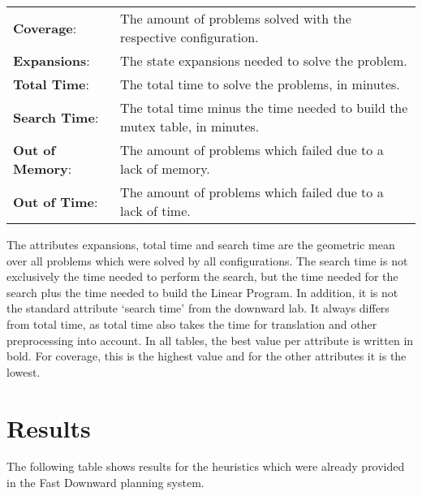 \begin{center}
    \begin{tabularx}{\textwidth}{@{}lX@{}}
        \textbf{Coverage}: & The amount of problems solved with the respective configuration. \\
        \textbf{Expansions}: & The state expansions needed to solve the problem. \\
        \textbf{Total Time}: & The total time to solve the problems, in minutes. \\
        \textbf{Search Time}: & The total time minus the time needed to build the mutex table, in minutes. \\
        \textbf{Out of Memory}: & The amount of problems which failed due to a lack of memory. \\
        \textbf{Out of Time}: & The amount of problems which failed due to a lack of time. \\
    \end{tabularx}
\end{center}

The attributes expansions, total time and search time are the geometric mean over all problems which were solved by all configurations.
The search time is not exclusively the time needed to perform the search, but the time needed for the search plus the time needed to build the Linear Program.
In addition, it is not the standard attribute `search time' from the downward lab.
It always differs from total time, as total time also takes the time for translation and other preprocessing into account.
In all tables, the best value per attribute is written in bold.
For coverage, this is the highest value and for the other attributes it is the lowest.

\section{Results}\label{sec:results}
The following table shows results for the heuristics which were already provided in the Fast Downward planning system.

